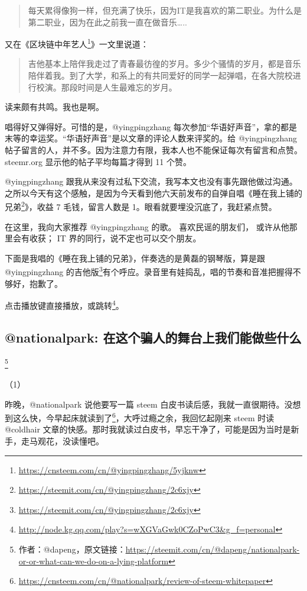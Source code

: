 \documentclass[]{ctexbook}
\renewcommand{\href}[2]{#2\footnote{\url{#1}}}
\begin{document}
\begin{quote}
每天累得像狗一样，但充满了快乐，因为IT是我喜欢的第二职业。为什么是第二职业，因为在此之前我一直在做音乐\ldots{}..
\end{quote}

又在《\href{https://cnsteem.com/cn/@yingpingzhang/5yjknw}{区块链中年艺人}》一文里说道：

\begin{quote}
吉他基本上陪伴我走过了青春最彷徨的岁月。多少个骚情的岁月，都是音乐陪伴着我。到了大学，和系上的有共同爱好的同学一起弹唱，在各大院校进行校演。那段时间是人生最难忘的岁月。
\end{quote}

读来颇有共鸣。我也是啊。

唱得好又弹得好。可惜的是，@yingpingzhang 每次参加``华语好声音''，拿的都是末等的幸运奖。``华语好声音''是以文章的评论人数来评奖的。给 @yingpingzhang 帖子留言的人，并不多。因为注意力有限，我本人也不能保证每次有留言和点赞。steemr.org 显示他的帖子平均每篇才得到 11 个赞。

@yingpingzhang 跟我从来没有过私下交流，我写本文也没有事先跟他做过沟通。之所以今天有这个感触，是因为今天看到他六天前发布的自弹自唱《\href{https://steemit.com/cn/@yingpingzhang/2c6xjy}{睡在我上铺的兄弟}》，收益 7 毛钱，留言人数是 1。眼看就要埋没沉底了，我赶紧点赞。

在这里，我向大家推荐 @yingpingzhang 的歌。 喜欢民谣的朋友们， 或许从他那里会有收获； IT 界的同行，说不定也可以交个朋友。

下面是我唱的《睡在我上铺的兄弟》，伴奏选的是黄磊的钢琴版，算是跟 \href{https://steemit.com/cn/@yingpingzhang/2c6xjy}{@yingpingzhang 的吉他版}有个呼应。录音里有娃捣乱，唱的节奏和音准把握得不够好，抱歉了。

点击播放键直接播放，或\href{http://node.kg.qq.com/play?s=wXGVaGwk0CZoPwC3\&g_f=personal}{跳转}。

\hypertarget{nationalpark-}{%
\subsection{@nationalpark: 在这个骗人的舞台上我们能做些什么}\label{nationalpark-}}

\footnote{作者：@dapeng，原文链接：\url{https://steemit.com/cn/@dapeng/nationalpark-or-or-what-can-we-do-on-a-lying-platform}}

（1）

昨晚，@nationalpark 说他要写一篇 steem 白皮书读后感，我就一直很期待。没想到这么快，今早起床就\href{https://cnsteem.com/cn/@nationalpark/review-of-steem-whitepaper}{读到了}，大呼过瘾之余，我回忆起刚来 steem 时读 @coldhair 文章的快感。那时我就读过白皮书，早忘干净了，可能是因为当时是新手，走马观花，没读懂吧。
\end{document}
